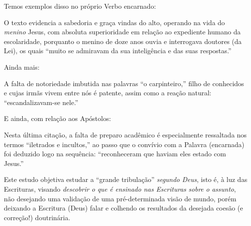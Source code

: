     Temos exemplos disso no próprio Verbo encarnado:


    O texto evidencia a sabedoria e graça vindas do alto, operando na vida do \emph{menino} Jesus, com absoluta superioridade em
    relação ao expediente humano da escolaridade, porquanto o menino de doze anos ouvia e  interrogava  doutores  (da  Lei),  os
    quais ``muito se admiravam da sua inteligência e das suas respostas.''

    Ainda mais:


    A falta de notoriedade imbutida nas palavras ``o carpinteiro,'' filho de conhecidos e cujas irmãs vivem entre nós é patente,
    assim como a reação natural: ``escandalizavam-se nele.''

    E ainda, com relação aos Apóstolos:


    Nesta última citação, a falta de preparo acadêmico é especialmente ressaltada nos termos ``iletrados e incultos,'' ao  passo
    que o convívio com a Palavra (encarnada) foi deduzido logo na sequência: ``reconheceram que haviam eles estado com Jesus.''

    Este estudo objetiva  estudar  a  ``grande  tribulação''  \emph{segundo  Deus},  isto  é,  à  luz  das  Escrituras,  visando
    \emph{descobrir o que é ensinado nas Escrituras sobre o assunto}, não desejando uma validação de uma  pré-determinada  visão
    de mundo, porém deixando a Escritura (Deus) falar e colhendo os resultados da desejada coesão (e correção!) doutrinária.


